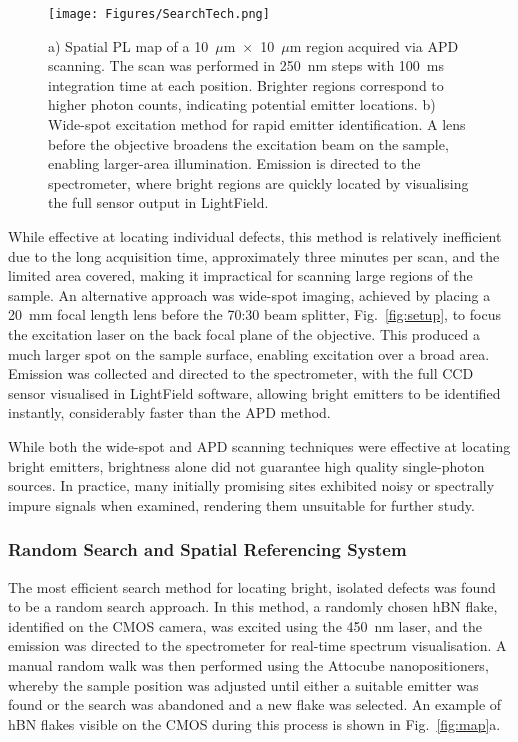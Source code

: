 \begin{figure}
    \centering
    \texttt{[image: Figures/SearchTech.png]}
    \caption{a) Spatial PL map of a 10~$\mu$m~$\times$~10~$\mu$m region acquired via APD scanning. The scan was performed in 250~nm steps with 100~ms integration time at each position. Brighter regions correspond to higher photon counts, indicating potential emitter locations. b) Wide-spot excitation method for rapid emitter identification. A lens before the objective broadens the excitation beam on the sample, enabling larger-area illumination. Emission is directed to the spectrometer, where bright regions are quickly located by visualising the full sensor output in LightField.}
    \label{fig:search-tech}
\end{figure}

While effective at locating individual defects, this method is relatively inefficient due to the long acquisition time, approximately three minutes per scan, and the limited area covered, making it impractical for scanning large regions of the sample. An alternative approach was wide-spot imaging, achieved by placing a 20~mm focal length lens before the 70:30 beam splitter, Fig.~\ref{fig:setup}, to focus the excitation laser on the back focal plane of the objective. This produced a much larger spot on the sample surface, enabling excitation over a broad area. Emission was collected and directed to the spectrometer, with the full CCD sensor visualised in LightField software, allowing bright emitters to be identified instantly, considerably faster than the APD method.

While both the wide-spot and APD scanning techniques were effective at locating bright emitters, brightness alone did not guarantee high quality single-photon sources. In practice, many initially promising sites exhibited noisy or spectrally impure signals when examined, rendering them unsuitable for further study.

\subsubsection{Random Search and Spatial Referencing System}

The most efficient search method for locating bright, isolated defects was found to be a random search approach. In this method, a randomly chosen hBN flake, identified on the CMOS camera, was excited using the 450~nm laser, and the emission was directed to the spectrometer for real-time spectrum visualisation. A manual random walk was then performed using the Attocube nanopositioners, whereby the sample position was adjusted until either a suitable emitter was found or the search was abandoned and a new flake was selected. An example of hBN flakes visible on the CMOS during this process is shown in Fig.~\ref{fig:map}a.

